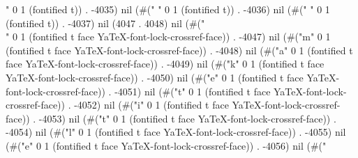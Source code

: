 " 0 1 (fontified t)) . -4035) nil (#(" " 0 1 (fontified t)) . -4036) nil (#(" " 0 1 (fontified t)) . -4037) nil (4047 . 4048) nil (#("\\" 0 1 (fontified t face YaTeX-font-lock-crossref-face)) . -4047) nil (#("m" 0 1 (fontified t face YaTeX-font-lock-crossref-face)) . -4048) nil (#("a" 0 1 (fontified t face YaTeX-font-lock-crossref-face)) . -4049) nil (#("k" 0 1 (fontified t face YaTeX-font-lock-crossref-face)) . -4050) nil (#("e" 0 1 (fontified t face YaTeX-font-lock-crossref-face)) . -4051) nil (#("t" 0 1 (fontified t face YaTeX-font-lock-crossref-face)) . -4052) nil (#("i" 0 1 (fontified t face YaTeX-font-lock-crossref-face)) . -4053) nil (#("t" 0 1 (fontified t face YaTeX-font-lock-crossref-face)) . -4054) nil (#("l" 0 1 (fontified t face YaTeX-font-lock-crossref-face)) . -4055) nil (#("e" 0 1 (fontified t face YaTeX-font-lock-crossref-face)) . -4056) nil (#("
